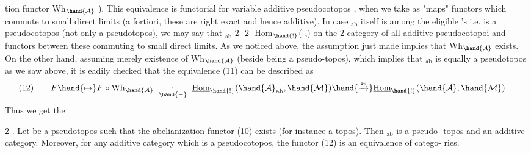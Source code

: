 tion functor Wh$_{\hand{\mathcal{A}}}$ ). This equivalence is functorial for variable additive
pseudocotopos , when we take as "maps"   functors
which commute to small direct limits (a fortiori, these are right exact
and hence additive). In case $_{\mathrm{ab}}$ itself is among the eligible 's
i.e. is a pseudocotopos (not only a pseudotopos), we may say that
$_{\mathrm{ab}}$ 2-\hand{\uline{\textcolor{black}{represents}}} \hand{\uline{\textcolor{black}{the}}} 2-\hand{\uline{\textcolor{black}{functor}}} \uline{Hom}$_{\hand{!}}$( ,) on the 2-category
of all additive pseudocotopoi and functors between these commuting to
small direct limits.  As we noticed above, the assumption
just made implies that Wh$_{\hand{\mathcal{A}}}$ exists. On the other hand, assuming merely
existence of Wh$_{\hand{\mathcal{A}}}$ (beside  being a pseudo-topos), which implies that
$_{\mathrm{ab}}$ is equally a pseudotopos as we saw above, it is eadily checked that
the equivalence (11) can be described as
\[ (12) \qquad F \hand{\mapsto} F\circ \mathrm{Wh}_{\hand{\mathcal{A}}} \ \underset{\hand{-}}{:}\ \underline{\mathrm{Hom}}_{\hand{!}}(\hand{\mathcal{A}}_{\mathrm{ab}},\hand{\mathcal{M}}) \hand{\xrightarrow{\approx}} \underline{\mathrm{Hom}}_{\hand{!}}(\hand{\mathcal{A}},\hand{\mathcal{M}}) \quad . \]
Thus we get the

\hand{\uline{\textcolor{black}{Proposition}}} 2 . Let  be a pseudotopos such that the abelianization
functor (10) exists (for instance  a topos). Then $_{\mathrm{ab}}$ is a pseudo-%
topos and an additive category. Moreover, for any additive category 
which is a pseudocotopos, the functor (12) is an equivalence of catego-%
ries.

